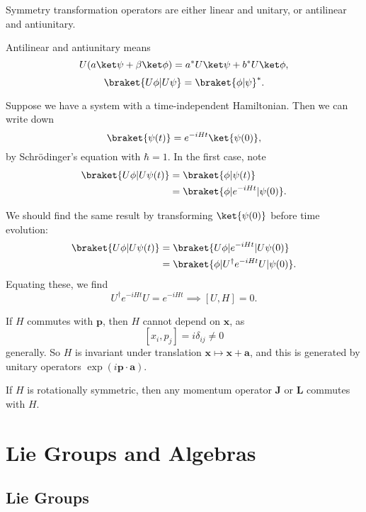\documentclass[12pt]{article}
\begin{document}
\begin{proposition}
	Symmetry transformation operators are either linear and unitary, or antilinear and antiunitary.
\end{proposition}

Antilinear and antiunitary means
\[
U(a\ket \psi + \beta \ket \phi) = a^\ast U \ket \psi + b^\ast U \ket \phi,
\]
\[
	\braket{U\phi | U\psi} = \braket{\phi|\psi}^\ast.
\]

Suppose we have a system with a time-independent Hamiltonian. Then we can write down
\[
	\braket{\psi(t)}=  e^{-iHt} \ket{\psi(0)},
\]
by Schr\"odinger's equation with $\hbar = 1$. In the first case, note
\begin{align*}
	\braket{U \phi | U \psi(t)} &= \braket{\phi|\psi(t)} \\
				    &= \braket{\phi | e^{-iHt}| \psi(0)}.
\end{align*}

We should find the same result by transforming $\ket{\psi(0)}$ before time evolution:
\begin{align*}
	\braket{U\phi | U \psi(t)} &= \braket{U\phi | e^{-iHt} | U\psi(0)} \\
				   &= \braket{\phi | U^{\dagger} e^{-iHt} U | \psi(0)}.
\end{align*}
Equating these, we find
\[
	U^{\dagger} e^{-iHt}U = e^{-iHt} \implies [U, H] = 0.
\]

\begin{exbox}
	If $H$ commutes with $\mathbf{p}$, then $H$ cannot depend on $\mathbf{x}$, as
	\[
		[x_i, p_j] = i \delta_{ij} \neq 0
	\]
	generally. So $H$ is invariant under translation $\mathbf{x} \mapsto \mathbf{x} + \mathbf{a}$, and this is generated by unitary operators $\exp(i \mathbf{p} \cdot \mathbf{a})$.

	If $H$ is rotationally symmetric, then any momentum operator $\mathbf{J}$ or $\mathbf{L}$ commutes with $H$.
\end{exbox}

\newpage

\section{Lie Groups and Algebras}%
\label{sec:lie_g_alg}

\subsection{Lie Groups}%
\label{sub:lie_g}
\end{document}
